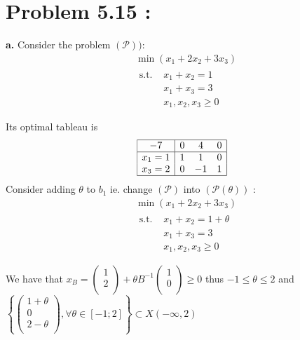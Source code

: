 \documentclass{article}
\begin{document}
\section*{Problem 5.15 :}
\textbf{a.} Consider the problem $(\mathcal{P}))$: 
\begin{equation*}
\begin{split}
    &\min(x_1+2x_2+3x_3)\\
    &\begin{split}
        \text{s.t. }& x_1+x_2 = 1\\
        & x_1 + x_3 = 3\\
        & x_1,x_2,x_3\ge 0\\
    \end{split}\\
\end{split}
\end{equation*}
Its optimal tableau is $$\begin{array}{|c|ccc|}\hline
    -7&0&4&0\\\hline
    x_1=1&1&1&0\\
    x_3=2&0&-1&1\\\hline
\end{array}$$ Consider adding $\theta$ to $b_1$ ie. change $(\mathcal{P})$ into $(\mathcal{P}(\theta))$ : 
\begin{equation*}
    \begin{split}
        &\min(x_1+2x_2+3x_3)\\
        &\begin{split}
            \text{s.t. }& x_1+x_2 = 1+\theta\\
            & x_1 + x_3 = 3\\
            & x_1,x_2,x_3\ge 0\\
        \end{split}\\
    \end{split}
    \end{equation*}
We have that $x_B = \left(\begin{array}{c}1\\2\\\end{array}\right)+\theta B^{-1}\left(\begin{array}{c}
    1\\
    0\\
\end{array}\right) \ge 0$ thus $-1\leq \theta\leq 2$ and $\left\{\left(\begin{array}{c}1+\theta\\0\\2-\theta\\\end{array}\right) ,\forall \theta \in [-1;2]\right\}\subset X(-\infty,2)$
\end{document}
